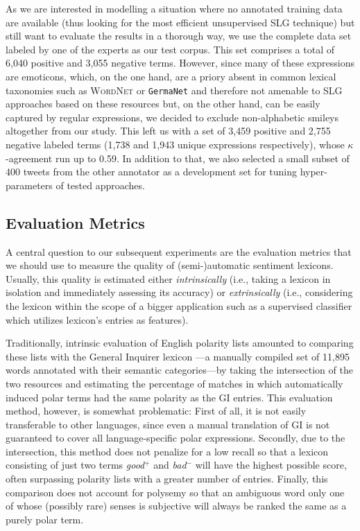 As we are interested in modelling a situation where no annotated
training data are available (thus looking for the most efficient
unsupervised SLG technique) but still want to evaluate the results in
a thorough way, we use the complete data set labeled by one of the
experts as our test corpus.  This set comprises a total of 6,040
positive and 3,055 negative terms.  However, since many of these
expressions are emoticons, which, on the one hand, are a priory absent
in common lexical taxonomies such as \textsc{WordNet}
\cite{Miller:95,Miller:07} or \texttt{GermaNet} \cite{Hamp:97} and
therefore not amenable to SLG approaches based on these resources but,
on the other hand, can be easily captured by regular expressions, we
decided to exclude non-alphabetic smileys altogether from our study.
This left us with a set of 3,459 positive and 2,755 negative labeled
terms (1,738 and 1,943 unique expressions respectively), whose
$\kappa$-agreement run up to 0.59.  In addition to that, we also
selected a small subset of 400 tweets from the other annotator as a
development set for tuning hyper-parameters of tested approaches.

\subsection{Evaluation Metrics}\label{subsec:snt-lex:eval-metrics}

A central question to our subsequent experiments are the evaluation
metrics that we should use to measure the quality of (semi-)automatic
sentiment lexicons.  Usually, this quality is estimated either
\textit{intrinsically} (i.e., taking a lexicon in isolation and
immediately assessing its accuracy) or \textit{extrinsically} (i.e.,
considering the lexicon within the scope of a bigger application such
as a supervised classifier which utilizes lexicon's entries as
features).

Traditionally, intrinsic evaluation of English polarity lists amounted
to comparing these lists with the General Inquirer lexicon \cite[GI;
][]{Stone:66}---a manually compiled set of 11,895 words annotated with
their semantic categories---by taking the intersection of the two
resources and estimating the percentage of matches in which
automatically induced polar terms had the same polarity as the GI
entries.  This evaluation method, however, is somewhat problematic:
First of all, it is not easily transferable to other languages, since
even a manual translation of GI is not guaranteed to cover all
language-specific polar expressions.  Secondly, due to the
intersection, this method does not penalize for a low recall so that a
lexicon consisting of just two terms \textit{good}$^+$ and
\textit{bad}$^-$ will have the highest possible score, often
surpassing polarity lists with a greater number of entries.  Finally,
this comparison does not account for polysemy so that an ambiguous
word only one of whose (possibly rare) senses is subjective will
always be ranked the same as a purely polar term.

